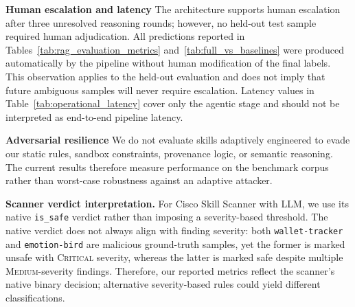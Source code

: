 \textbf{Human escalation and latency}
The architecture supports human escalation after three unresolved
reasoning rounds; however, no held-out test sample required human
adjudication. All predictions reported in
Tables~\ref{tab:rag_evaluation_metrics} and~\ref{tab:full_vs_baselines}
were produced automatically by the pipeline without human modification
of the final labels. This observation applies to the held-out
evaluation and does not imply that future ambiguous samples will never
require escalation. Latency values in
Table~\ref{tab:operational_latency} cover only the agentic stage and
should not be interpreted as end-to-end pipeline latency.

\textbf{Adversarial resilience}
We do not evaluate skills adaptively engineered to evade our static rules, sandbox constraints, provenance logic, or semantic reasoning. The current results therefore measure performance on the benchmark corpus rather than worst-case robustness against an adaptive attacker.

\textbf{Scanner verdict interpretation.}
For Cisco Skill Scanner with LLM, we use its native \texttt{is\_safe} verdict rather than imposing a severity-based threshold. The native verdict does not always align with finding severity: both \texttt{wallet-tracker} and \texttt{emotion-bird} are malicious ground-truth samples, yet the former is marked unsafe with \textsc{Critical} severity, whereas the latter is marked safe despite multiple \textsc{Medium}-severity findings. Therefore, our reported metrics reflect the scanner's native binary decision; alternative severity-based rules could yield different classifications.